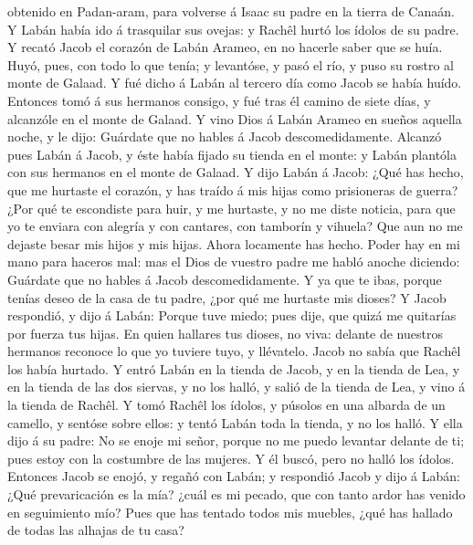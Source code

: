 obtenido en Padan-aram, para volverse á Isaac su padre en la tierra de
Canaán.  Y Labán había ido á trasquilar sus ovejas: y
Rachêl hurtó los ídolos de su padre.  Y recató Jacob el
corazón de Labán Arameo, en no hacerle saber que se huía.
 Huyó, pues, con todo lo que tenía; y levantóse, y pasó
el río, y puso su rostro al monte de Galaad.  Y fué dicho
á Labán al tercero día como Jacob se había huído. 
Entonces tomó á sus hermanos consigo, y fué tras él camino de siete
días, y alcanzóle en el monte de Galaad.  Y vino Dios á
Labán Arameo en sueños aquella noche, y le dijo: Guárdate que no hables
á Jacob descomedidamente.  Alcanzó pues Labán á Jacob, y
éste había fijado su tienda en el monte: y Labán plantóla con sus
hermanos en el monte de Galaad.  Y dijo Labán á Jacob:
¿Qué has hecho, que me hurtaste el corazón, y has traído á mis hijas
como prisioneras de guerra?  ¿Por qué te escondiste para
huir, y me hurtaste, y no me diste noticia, para que yo te enviara con
alegría y con cantares, con tamborín y vihuela?  Que aun
no me dejaste besar mis hijos y mis hijas. Ahora locamente has hecho.
 Poder hay en mi mano para haceros mal: mas el Dios de
vuestro padre me habló anoche diciendo: Guárdate que no hables á Jacob
descomedidamente.  Y ya que te ibas, porque tenías deseo
de la casa de tu padre, ¿por qué me hurtaste mis dioses? 
Y Jacob respondió, y dijo á Labán: Porque tuve miedo; pues dije, que
quizá me quitarías por fuerza tus hijas.  En quien
hallares tus dioses, no viva: delante de nuestros hermanos reconoce lo
que yo tuviere tuyo, y llévatelo. Jacob no sabía que Rachêl los había
hurtado.  Y entró Labán en la tienda de Jacob, y en la
tienda de Lea, y en la tienda de las dos siervas, y no los halló, y
salió de la tienda de Lea, y vino á la tienda de Rachêl. 
Y tomó Rachêl los ídolos, y púsolos en una albarda de un camello, y
sentóse sobre ellos: y tentó Labán toda la tienda, y no los halló.
 Y ella dijo á su padre: No se enoje mi señor, porque no
me puedo levantar delante de ti; pues estoy con la costumbre de las
mujeres. Y él buscó, pero no halló los ídolos.  Entonces
Jacob se enojó, y regañó con Labán; y respondió Jacob y dijo á Labán:
¿Qué prevaricación es la mía? ¿cuál es mi pecado, que con tanto ardor
has venido en seguimiento mío?  Pues que has tentado
todos mis muebles, ¿qué has hallado de todas las alhajas de tu casa?
